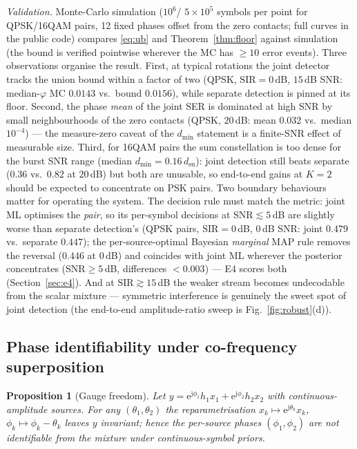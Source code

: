 \documentclass[journal]{IEEEtran}
\newcommand{\snr}{\mathrm{SNR}}
\newcommand{\sir}{\mathrm{SIR}}
\newcommand{\ee}{\mathrm{e}}
\newcommand{\jj}{\mathrm{j}}
\newtheorem{proposition}{Proposition}
\begin{document}
\emph{Validation.} Monte-Carlo simulation
($10^6$/
$5 \times 10^5$ symbols per point for QPSK/16QAM pairs, 12 fixed
phases offset from the zero contacts; full curves in the public code)
compares \eqref{eq:ub} and
Theorem~\ref{thm:floor} against simulation (the bound is verified pointwise
wherever the MC has $\geq 10$ error events). Three observations
organise the result. First, at
typical rotations the joint detector tracks the union bound within a
factor of two (QPSK, $\sir = 0$\,dB, $15$\,dB SNR: median-$\varphi$ MC
$0.0143$ vs.\ bound $0.0156$), while separate detection is pinned at its
floor. Second, the phase \emph{mean} of the joint SER is dominated at
high SNR by small neighbourhoods of the zero contacts (QPSK, $20$\,dB:
mean $0.032$ vs.\ median $10^{-4}$) --- the measure-zero caveat of the
$d_{\min}$ statement is a finite-SNR effect of measurable size. Third,
for 16QAM pairs the sum constellation is too dense for the burst SNR
range (median $d_{\min} = 0.16\, d_{\mathrm{su}}$): joint detection
still beats separate ($0.36$ vs.\ $0.82$ at $20$\,dB) but both are
unusable, so end-to-end gains at $K{=}2$ should be expected to
concentrate on PSK pairs. Two boundary behaviours matter for operating
the system. The decision rule must match
the metric: joint ML optimises the \emph{pair}, so its per-symbol
decisions at $\snr \lesssim 5$\,dB are slightly worse than separate
detection's (QPSK pairs, $\sir = 0$\,dB, $0$\,dB SNR: joint $0.479$
vs.\ separate $0.447$); the per-source-optimal Bayesian
\emph{marginal} MAP rule removes the reversal ($0.446$ at
$0$\,dB) and coincides with joint ML wherever the
posterior concentrates ($\snr \geq 5$\,dB, differences $< 0.003$) --- E4
scores both (Section~\ref{sec:e4}). And at
$\sir \gtrsim 15$\,dB the weaker stream becomes undecodable from the
scalar mixture --- symmetric interference is genuinely the sweet spot of
joint detection (the end-to-end amplitude-ratio sweep is
Fig.~\ref{fig:robust}(d)).

\subsection{Phase identifiability under co-frequency superposition}
\label{sec:theory-phase}

\begin{proposition}[Gauge freedom]
\label{prop:gauge}
Let $y = \ee^{\jj\phi_1} h_1 x_1 + \ee^{\jj\phi_2} h_2 x_2$ with
continuous-amplitude sources. For any $(\theta_1, \theta_2)$ the
reparametrisation $x_k \mapsto \ee^{\jj\theta_k} x_k$,
$\phi_k \mapsto \phi_k - \theta_k$ leaves $y$ invariant; hence the
per-source phases $(\phi_1, \phi_2)$ are not identifiable from the
mixture under continuous-symbol priors.
\end{proposition}
\end{document}
